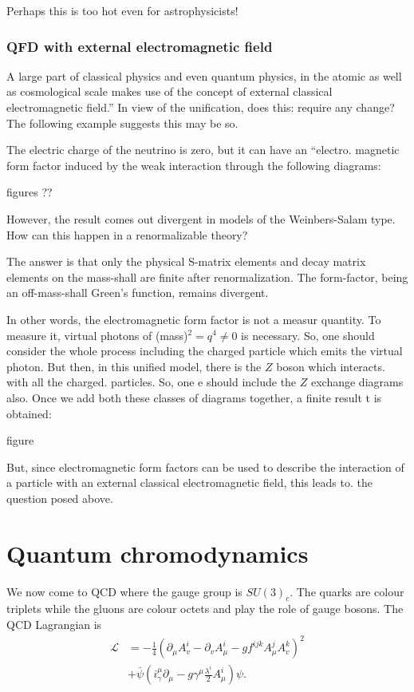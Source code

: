 Perhaps this is too hot even for astrophysicists! 

\subsubsection*{QFD with external electromagnetic field}

A large part of classical physics and even quantum physics, in the atomic
as well as cosmological scale makes use of the concept of external classical
electromagnetic field.” In view of the unification, does this: require any
change? The following example suggests this may be so.

The electric charge of the neutrino is zero, but it can have an “electro.
magnetic form factor induced by the weak interaction through the following diagrams: 

figures ??

However, the result comes out divergent  in models of the Weinbers-Salam
type. How can this happen in a renormalizable theory? 

The answer is that only the physical S-matrix elements and decay
matrix elements on the mass-shall are finite after renormalization. The
form-factor, being an off-mass-shall Green's function, remains divergent.

In other words, the electromagnetic form factor is not a measur
quantity. To measure it, virtual photons of (mass)$^{2}= q^{4} \neq 0$ is necessary.
So, one should consider the whole process including the charged particle which emits the virtual photon. But then, in this unified model, there is the $Z$ boson which interacts. with all the charged. particles. So, one e should
include the $Z$ exchange diagrams also. Once we add both these classes
of diagrams together, a finite result t is obtained: 


figure


But, since electromagnetic form factors can be used to describe the
interaction of a particle with an external classical electromagnetic field,
this leads to. the question posed above. 

\section{Quantum chromodynamics}

We now come to QCD where the gauge group is $SU (3)_{c}$. The quarks are
colour triplets while the gluons are colour octets and play the role of gauge
bosons. The QCD Lagrangian is 
\begin{align*}
\mathcal{L} &= - \frac{1}{4} (\partial_{\mu} A_{v}^{i}- \partial_{v}A^{i}_{\mu}- gf^{ijk}A^{j}_{\mu}A_{v}^{k})^{2}\\
&+ \bar{\psi}(i_{\gamma}^{\mu} \partial_{\mu} - g\gamma^{\mu} \frac{\lambda^{i}}{2}A_{\mu}^{i})\psi.
\end{align*}

